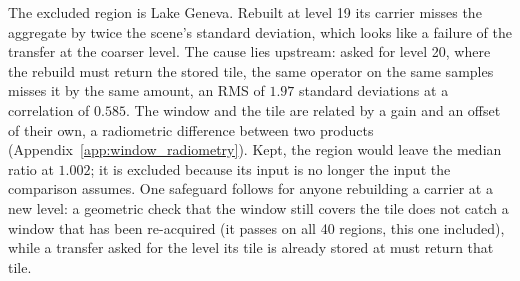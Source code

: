The excluded region is Lake Geneva. Rebuilt at level 19 its carrier
misses the aggregate by twice the scene's standard deviation, which looks
like a failure of the transfer at the coarser level. The cause lies
upstream: asked for level 20, where the rebuild must return the stored
tile, the same operator on the same samples misses it by the same amount,
an RMS of $1.97$ standard deviations at a correlation of $0.585$. The
window and the tile are related by a gain and an offset of their own, a
radiometric difference between two products
(Appendix~\ref{app:window_radiometry}). Kept, the region would leave the
median ratio at $1.002$; it is excluded because its input is no longer
the input the comparison assumes. One safeguard follows for anyone
rebuilding a carrier at a new level: a geometric check that the window
still covers the tile does not catch a window that has been re-acquired
(it passes on all 40 regions, this one included), while a transfer asked
for the level its tile is already stored at must return that tile.
